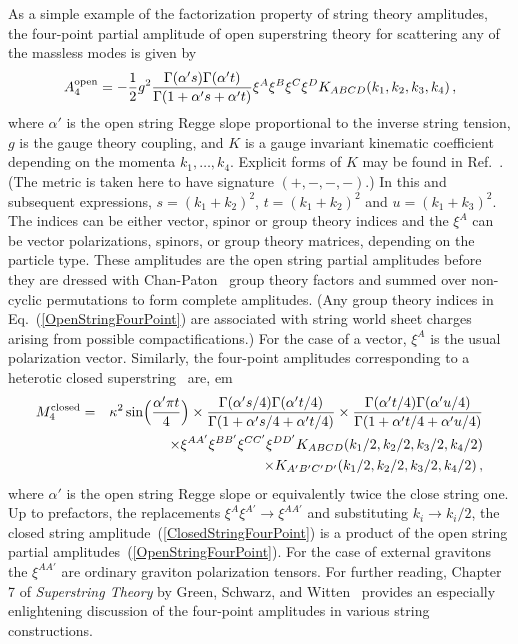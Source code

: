 As a simple example of the factorization property of string 
theory amplitudes, the four-point partial amplitude of open 
superstring theory for scattering any of the massless modes is given by 
%
\begin{equation}
A_4^{\rm open} = 
-{1\over 2} g^2 {\Gamma(\alpha's)  \Gamma(\alpha' t) \over 
\Gamma(1 + \alpha's + \alpha' t)} 
\xi^A \xi^B \xi^C \xi^D
K_{A B C D}(k_1, k_2, k_3, k_4) \,,
\label{OpenStringFourPoint}
\end{equation}
%
where $\alpha'$ is the open string Regge slope proportional to the
inverse string tension, $g$ is the gauge theory coupling, and $K$ is a
gauge invariant kinematic coefficient depending on the momenta $k_1,
\ldots, k_4$. Explicit forms of $K$ may be found in Ref.~\cite{GSW}.
(The metric is taken here to have signature
$(+,-,-,-)$.)  In this and subsequent expressions, $s = (k_1 +
k_2)^2$, $t = (k_1 + k_2)^2$ and $u = (k_1 + k_3)^2$.  The indices can
be either vector, spinor or group theory indices and the $\xi^A$ can
be vector polarizations, spinors, or group theory matrices, depending
on the particle type.  These amplitudes are the open string partial
amplitudes before they are dressed with Chan-Paton~\cite{ChanPaton} group
theory factors and summed over non-cyclic permutations to form
complete amplitudes. (Any group theory indices in
Eq.~(\ref{OpenStringFourPoint}) are associated with string world sheet
charges arising from possible compactifications.)  For the case of a
vector, $\xi^A$ is the usual polarization vector.  Similarly, the
four-point amplitudes corresponding to a heterotic closed
superstring~\cite{Gross85Heterotic,Gross86Heterotic} are,
% 
 em
\begin{eqnarray}
M_4^{\rm closed} &=& 
\kappa^2  \sin\Bigl({\alpha' \pi t \over 4} \Bigr) \times 
 {\Gamma(\alpha's/4)  \Gamma(\alpha't/4) \over 
      \Gamma(1 + \alpha's/4 + \alpha' t/4)}
\times  {\Gamma(\alpha't/4)  \Gamma(\alpha' u/4) 
      \over \Gamma(1 + \alpha't/4 + \alpha'u/4)} \nonumber \\
&& \times 
\xi^{AA'} \xi^{BB'} \xi^{CC'} \xi^{DD'}
K_{A B C D}(k_1/2, k_2/2, k_3/2, k_4/2) \nonumber \\
&& \hskip 3 cm \times
K_{A' B' C' D'}(k_1/2, k_2/2, k_3/2, k_4/2) \,,
\label{ClosedStringFourPoint}
\end{eqnarray}
%
where $\alpha'$ is the open string Regge slope or equivalently twice
the close string one.
Up to prefactors, the
replacements $\xi^A \xi^{A'} \rightarrow \xi^{A A'}$ and substituting  $k_i
\rightarrow k_i/2$, the closed string
amplitude~(\ref{ClosedStringFourPoint}) is a product of the open
string partial amplitudes~(\ref{OpenStringFourPoint}).  For the case of
external gravitons the $\xi^{AA'}$ are ordinary graviton polarization
tensors.  For further reading, Chapter 7 of {\it Superstring Theory}
by Green, Schwarz, and Witten~\cite{GSW} provides an especially
enlightening discussion of the four-point amplitudes in various string
constructions.

